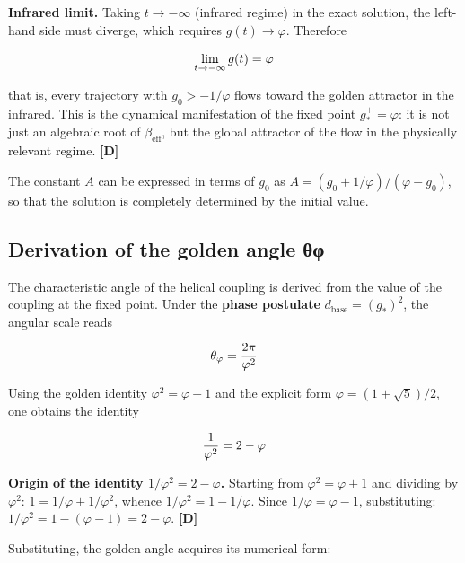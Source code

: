 ﻿\documentclass[11pt,letterpaper]{article}
\begin{document}
\textbf{Infrared limit.} Taking $t \to -\infty$ (infrared regime) in the exact solution, the left-hand side must diverge, which requires $g(t) \to \varphi$. Therefore

\begin{equation*}
  \resizebox{\ifdim\width>\linewidth \linewidth\else\width\fi}{!}{$\displaystyle \lim_{t \to -\infty} g(t) = \varphi$}
\end{equation*}

that is, every trajectory with $g_0 > -1/\varphi$ flows toward the golden attractor in the infrared. This is the dynamical manifestation of the fixed point $g_*^+ = \varphi$: it is not just an algebraic root of $\beta_{\text{eff}}$, but the global attractor of the flow in the physically relevant regime. \textbf{[D]}

The constant $A$ can be expressed in terms of $g_0$ as $A = (g_0 + 1/\varphi)/(\varphi - g_0)$, so that the solution is completely determined by the initial value.
\subsection{Derivation of the golden angle θφ}
The characteristic angle of the helical coupling is derived from the value of the coupling at the fixed point. Under the \textbf{phase postulate} $d_{\text{base}} = (g_*)^2$, the angular scale reads

\begin{equation*}
  \resizebox{\ifdim\width>\linewidth \linewidth\else\width\fi}{!}{$\displaystyle \theta_\varphi = \frac{2\pi}{\varphi^2}$}
\end{equation*}

Using the golden identity $\varphi^2 = \varphi + 1$ and the explicit form $\varphi = (1 + \sqrt{5})/2$, one obtains the identity

\begin{equation*}
  \resizebox{\ifdim\width>\linewidth \linewidth\else\width\fi}{!}{$\displaystyle \frac{1}{\varphi^2} = 2 - \varphi$}
\end{equation*}

\textbf{Origin of the identity $1/\varphi^2 = 2 - \varphi$.} Starting from $\varphi^2 = \varphi + 1$ and dividing by $\varphi^2$: $1 = 1/\varphi + 1/\varphi^2$, whence $1/\varphi^2 = 1 - 1/\varphi$. Since $1/\varphi = \varphi - 1$, substituting: $1/\varphi^2 = 1 - (\varphi - 1) = 2 - \varphi$. \textbf{[D]}

Substituting, the golden angle acquires its numerical form:
\end{document}
